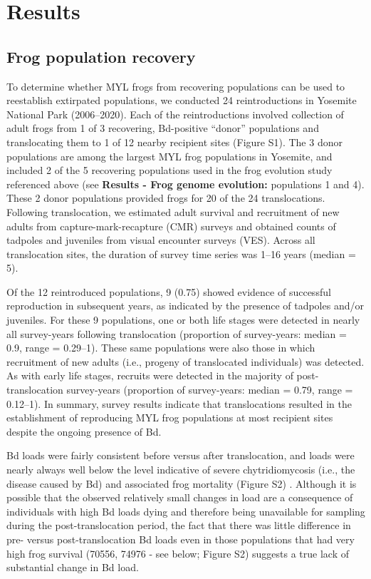 \documentclass[9pt,twocolumn,twoside,lineno]{pnas-new}
\begin{document}
\section*{Results}

\subsection*{Frog population recovery}

To determine whether MYL frogs from recovering populations can be used
to reestablish extirpated populations, we conducted 24 reintroductions
in Yosemite National Park (2006--2020). Each of the reintroductions
involved collection of adult frogs from 1 of 3 recovering, Bd-positive
``donor'' populations and translocating them to 1 of 12 nearby recipient
sites (Figure S1). The 3 donor populations are among
the largest MYL frog populations in Yosemite, and included 2 of the 5
recovering populations used in the frog evolution study referenced above
(see \textbf{Results - Frog genome evolution:} populations 1 and 4).
These 2 donor populations provided frogs for 20 of the 24
translocations. Following translocation, we estimated adult survival and
recruitment of new adults from capture-mark-recapture (CMR) surveys and
obtained counts of tadpoles and juveniles from visual encounter surveys
(VES). Across all translocation sites, the duration of survey time
series was 1--16 years (median = 5).

Of the 12 reintroduced populations, 9 (0.75) showed evidence of
successful reproduction in subsequent years, as indicated by the
presence of tadpoles and/or juveniles. For these 9 populations, one or
both life stages were detected in nearly all survey-years following
translocation (proportion of survey-years: median = 0.9, range =
0.29--1). These same populations were also those in which recruitment of
new adults (i.e., progeny of translocated individuals) was detected. As
with early life stages, recruits were detected in the majority of
post-translocation survey-years (proportion of survey-years: median =
0.79, range = 0.12--1). In summary, survey results indicate that
translocations resulted in the establishment of reproducing MYL frog
populations at most recipient sites despite the ongoing presence of Bd.

Bd loads were fairly consistent before versus after translocation, and
loads were nearly always well below the level indicative of severe
chytridiomycosis (i.e., the disease caused by Bd) and associated frog
mortality (Figure S2)
\citep{joseph2018, vredenburg2010}. Although it is possible that the
observed relatively small changes in load are a consequence of
individuals with high Bd loads dying and therefore being unavailable for
sampling during the post-translocation period, the fact that there was
little difference in pre- versus post-translocation Bd loads even in
those populations that had very high frog survival (70556, 74976 - see
below; Figure S2) suggests a true lack of
substantial change in Bd load.
\end{document}
